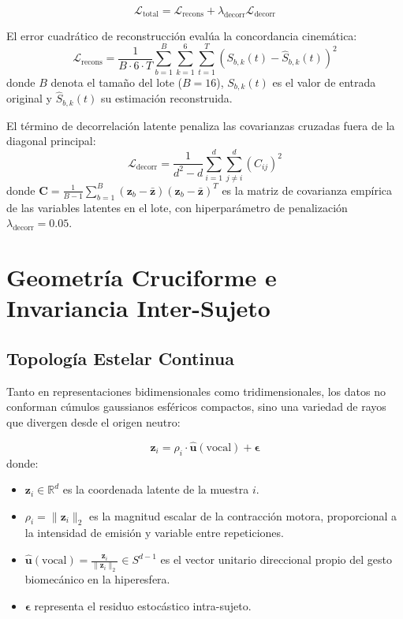 \documentclass[11pt,a4paper,openany]{book}
\theoremstyle{definition}
\begin{document}
\begin{equation}
    \mathcal{L}_{\text{total}} = \mathcal{L}_{\text{recons}} + \lambda_{\text{decorr}} \mathcal{L}_{\text{decorr}}
    \label{eq:loss_total}
\end{equation}

El error cuadrático de reconstrucción evalúa la concordancia cinemática:
\begin{equation}
    \mathcal{L}_{\text{recons}} = \frac{1}{B \cdot 6 \cdot T} \sum_{b=1}^{B} \sum_{k=1}^{6} \sum_{t=1}^{T} \left( S_{b,k}(t) - \hat{S}_{b,k}(t) \right)^2
    \label{eq:loss_recons}
\end{equation}
donde $B$ denota el tamaño del lote ($B=16$), $S_{b,k}(t)$ es el valor de entrada original y $\hat{S}_{b,k}(t)$ su estimación reconstruida.

El término de decorrelación latente penaliza las covarianzas cruzadas fuera de la diagonal principal:
\begin{equation}
    \mathcal{L}_{\text{decorr}} = \frac{1}{d^2 - d} \sum_{i=1}^{d} \sum_{j \neq i}^{d} \left( C_{ij} \right)^2
    \label{eq:loss_decorr}
\end{equation}
donde $\mathbf{C} = \frac{1}{B-1} \sum_{b=1}^{B} (\mathbf{z}_b - \bar{\mathbf{z}})(\mathbf{z}_b - \bar{\mathbf{z}})^T$ es la matriz de covarianza empírica de las variables latentes en el lote, con hiperparámetro de penalización $\lambda_{\text{decorr}} = 0.05$.

\section{Geometría Cruciforme e Invariancia Inter-Sujeto}
\label{sec:geometria_invarianza}

\subsection{Topología Estelar Continua}
\label{subsec:topologia_estelar}

Tanto en representaciones bidimensionales como tridimensionales, los datos no conforman cúmulos gaussianos esféricos compactos, sino una variedad de rayos que divergen desde el origen neutro:

\begin{equation}
    \mathbf{z}_i = \rho_i \cdot \hat{\mathbf{u}}(\text{vocal}) + \boldsymbol{\epsilon}
    \label{eq:modelo_radial}
\end{equation}
donde:
\begin{itemize}
    \item $\mathbf{z}_i \in \mathbb{R}^d$ es la coordenada latente de la muestra $i$.
    \item $\rho_i = \|\mathbf{z}_i\|_2$ es la magnitud escalar de la contracción motora, proporcional a la intensidad de emisión y variable entre repeticiones.
    \item $\hat{\mathbf{u}}(\text{vocal}) = \frac{\mathbf{z}_i}{\|\mathbf{z}_i\|_2} \in S^{d-1}$ es el vector unitario direccional propio del gesto biomecánico en la hiperesfera.
    \item $\boldsymbol{\epsilon}$ representa el residuo estocástico intra-sujeto.
\end{itemize}
\end{document}
